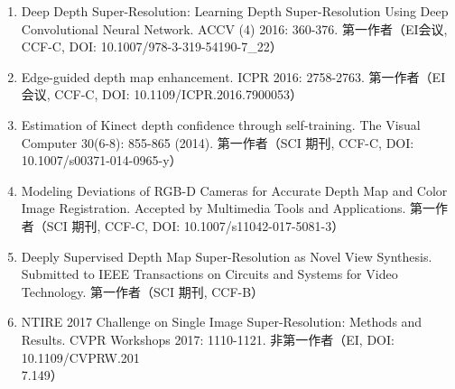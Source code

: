 
\begin{publications}

\begin{enumerate}
\item Deep Depth Super-Resolution: Learning Depth Super-Resolution Using Deep Convolutional Neural Network. ACCV (4) 2016: 360-376. 第一作者（EI会议, CCF-C, DOI: 10.1007/978-3-319-54190-7\_22）

\item Edge-guided depth map enhancement. ICPR 2016: 2758-2763. 第一作者（EI会议, CCF-C, DOI: 10.1109/ICPR.2016.7900053）

\item Estimation of Kinect depth confidence through self-training. The Visual Computer 30(6-8): 855-865 (2014). 第一作者（SCI 期刊, CCF-C, DOI: 10.1007/s00371-014-0965-y）

\item Modeling Deviations of RGB-D Cameras for Accurate Depth Map and Color Image Registration. Accepted by Multimedia Tools and Applications. 第一作者（SCI 期刊, CCF-C, DOI: 10.1007/s11042-017-5081-3）

\item Deeply Supervised Depth Map Super-Resolution as Novel View Synthesis. Submitted to IEEE Transactions on Circuits and Systems for Video Technology. 第一作者（SCI 期刊, CCF-B）

\item NTIRE 2017 Challenge on Single Image Super-Resolution: Methods and Results. CVPR Workshops 2017: 1110-1121. 非第一作者（EI, DOI: 10.1109/CVPRW.201\\7.149）
\end{enumerate}

\end{publications}

